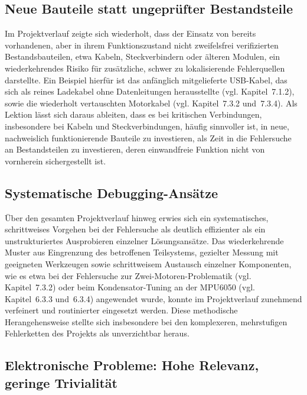 \documentclass[12pt,ngerman,numbers=noenddot,abstracton,headsepline]{scrreprt}
\begin{document}
\subsection{Neue Bauteile statt ungeprüfter Bestandsteile}
\label{subsec:lessons_bauteile}

Im Projektverlauf zeigte sich wiederholt, dass der Einsatz von bereits vorhandenen, aber in ihrem Funktionszustand nicht zweifelsfrei verifizierten Bestandsbauteilen, etwa Kabeln, Steckverbindern oder älteren Modulen, ein wiederkehrendes Risiko für zusätzliche, schwer zu lokalisierende Fehlerquellen darstellte. Ein Beispiel hierfür ist das anfänglich mitgelieferte USB-Kabel, das sich als reines Ladekabel ohne Datenleitungen herausstellte (vgl. Kapitel~7.1.2), sowie die wiederholt vertauschten Motorkabel (vgl. Kapitel~7.3.2 und~7.3.4). Als Lektion lässt sich daraus ableiten, dass es bei kritischen Verbindungen, insbesondere bei Kabeln und Steckverbindungen, häufig sinnvoller ist, in neue, nachweislich funktionierende Bauteile zu investieren, als Zeit in die Fehlersuche an Bestandsteilen zu investieren, deren einwandfreie Funktion nicht von vornherein sichergestellt ist.

\subsection{Systematische Debugging-Ansätze}
\label{subsec:lessons_debugging}

Über den gesamten Projektverlauf hinweg erwies sich ein systematisches, schrittweises Vorgehen bei der Fehlersuche als deutlich effizienter als ein unstrukturiertes Ausprobieren einzelner Lösungsansätze. Das wiederkehrende Muster aus Eingrenzung des betroffenen Teilsystems, gezielter Messung mit geeigneten Werkzeugen sowie schrittweisem Austausch einzelner Komponenten, wie es etwa bei der Fehlersuche zur Zwei-Motoren-Problematik (vgl. Kapitel~7.3.2) oder beim Kondensator-Tuning an der MPU6050 (vgl. Kapitel~6.3.3 und~6.3.4) angewendet wurde, konnte im Projektverlauf zunehmend verfeinert und routinierter eingesetzt werden. Diese methodische Herangehensweise stellte sich insbesondere bei den komplexeren, mehrstufigen Fehlerketten des Projekts als unverzichtbar heraus.

\subsection{Elektronische Probleme: Hohe Relevanz, geringe Trivialität}
\label{subsec:lessons_elektronik_relevanz}
\end{document}
